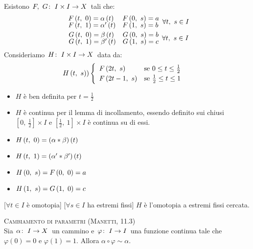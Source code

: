\begin{demonstration}
	Esistono $\funz{F,\ G}{I\times I}{X}$ tali che:
	\begin{gather*}
		\begin{array}{ll}
			\mvf{F}{t}{0}=\alpha\left(t\right)&\mvf{F}{0}{s}=a\\
			\mvf{F}{t}{1}=\alpha'\left(t\right)&\mvf{F}{1}{s}=b
		\end{array}
	\forall t,\ s\in I\\
		\begin{array}{ll}
	\mvf{G}{t}{0}=\beta\left(t\right)&\mvf{G}{0}{s}=b\\
	\mvf{G}{t}{1}=\beta'\left(t\right)&\mvf{G}{1}{s}=c
\end{array}	
	\forall t,\ s\in I
	\end{gather*}
Consideriamo $\funz{H}{I\times I}{X}$ data da:
\begin{equation*}
	H\left(t,\ s\right))\begin{cases}
				\begin{array}{lc}
			F\left(2t,\ s\right) & \text{se }0\leq t\leq \frac{1}{2}\\
			F\left(2t-1,\ s\right) & \text{se }\frac{1}{2}\leq t\leq 1	
		\end{array}
	\end{cases}
\end{equation*}
\begin{itemize}
	\item $H$ è ben definita per $t=\frac{1}{2}$
	\item $H$ è continua per il lemma di incollamento, essendo definito sui chiusi $\left[0,\ \frac{1}{2}\right]\times I$ e $\left[\frac{1}{2},\ 1\right]\times I$ è continua su di essi.
\item \parbox[t]{0.25\textwidth}{$H\left(t,\ 0\right)=\left(\alpha\ast\beta\right)\left(t\right)$}
\item \parbox[t]{0.25\textwidth}{$\mvf{H}{t}{1}=\left(\alpha'\ast\beta'\right)\left(t\right)\ $}
\item \parbox[t]{0.25\textwidth}{$H\left(0,\ s\right)=F\left(0,\ 0\right)=a$}
\item \parbox[t]{0.25\textwidth}{$H\left(1,\ s\right)=G\left(1,\ 0\right)=c$}
\end{itemize}
[$\forall t\in I$ è omotopia]
[$\forall s\in I$ ha estremi fissi]
$H$ è l'omotopia a estremi fissi cercata.
\end{demonstration}
\begin{lemming}\textsc{Cambiamento di parametri (Manetti, 11.3)}\\
	Sia $\funz{\alpha}{I}{X}$ un cammino e $\funz{\varphi}{I}{I}$ una funzione continua tale che $\varphi\left(0\right)=0$ e $\varphi\left(1\right)=1$. Allora $\alpha\circ \varphi\sim\alpha$.
\end{lemming}
